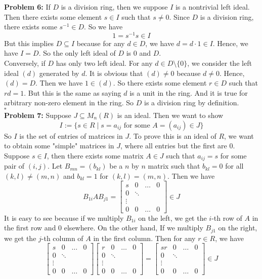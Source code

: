 \documentclass[12pt]{amsart}
\begin{document}
\textbf{Problem 6:} If $D$ is a division ring, then we suppose $I$ is a nontrivial left ideal. Then there exists some element $s\in I$ such that $s\neq 0$. Since $D$ is a division ring, there exists some $s^{-1}\in D$. So we have 
\[1=s^{-1}s\in I\]
But this implies $D\subseteq I$ because for any $d\in D$, we have $d=d\cdot 1\in I$. Hence, we have $I=D$. So the only left ideal of $D$ is $0$ and $D$.\\
Conversely, if $D$ has only two left ideal. For any $d\in D\setminus\{0\}$, we consider the left ideal $(d)$ generated by $d$. It is obvious that $(d)\neq 0$ because $d\neq 0$. Hence, $(d)=D$. Then we have $1\in (d)$. So there exists some element $r\in D$ such that $rd=1$. But this is the same as saying $d$ is a unit in the ring. And it is true for arbitrary non-zero element in the ring. So $D$ is a division ring by definition.
\\\phantom{qed}\hfill$\square$\\
\textbf{Problem 7:} Suppose $J\subseteq M_n(R)$ is an ideal. Then we want to show 
\[I:=\{s\in R\mid s=a_{ij} \text{ for some } A=(a_{ij})\in J\}\]
So $I$ is the set of entries of matrices in $J$. To prove this is an ideal of $R$, we want to obtain some "simple" matrices in $J$, where all entries but the first are 0.\\
Suppose $s\in I$, then there exists some matrix $A\in J$ such that $a_{ij}=s$ for some pair of $(i,j)$. Let $B_{mn}=(b_{kl})$ be a $n$ by $n$ matrix such that $b_{kl}=0$ for all $(k,l)\neq (m,n)$ and $b_{kl}=1$ for $(k,l)=(m,n)$. Then we have 
\[B_{1i}AB_{j1}=\begin{bmatrix}
    s&0&\dots &0\\
    0&\ddots\\
    \vdots\\
    0&0&\dots&0
\end{bmatrix}\in J\tag{1}\]
It is easy to see because if we multiply $B_{1i}$ on the left, we get the $i$-th row of $A$ in the first row and 0 elsewhere. On the other hand, If we multiply $B_{j1}$ on the right, we get the $j$-th column of $A$ in the first column. Then for any $r\in R$, we have 
\[\begin{bmatrix}
    s&0&\dots &0\\
    0&\ddots\\
    \vdots\\
    0&0&\dots&0
\end{bmatrix}\begin{bmatrix}
    r&0&\dots &0\\
    0&\ddots\\
    \vdots\\
    0&0&\dots&0
\end{bmatrix}=\begin{bmatrix}
    sr&0&\dots &0\\
    0&\ddots\\
    \vdots\\
    0&0&\dots&0
\end{bmatrix}\in J\tag{2}\]
\end{document}
